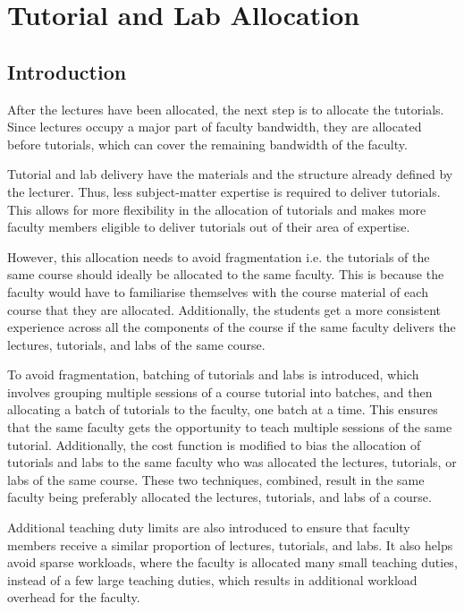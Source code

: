 \chapter{Tutorial and Lab Allocation}

\section{Introduction}

After the lectures have been allocated, the next step is to allocate the tutorials. Since lectures occupy a major part of faculty bandwidth, they are allocated before tutorials, which can cover the remaining bandwidth of the faculty.

Tutorial and lab delivery have the materials and the structure already defined by the lecturer. Thus, less subject-matter expertise is required to deliver tutorials. This allows for more flexibility in the allocation of tutorials and makes more faculty members eligible to deliver tutorials out of their area of expertise.

However, this allocation needs to avoid fragmentation i.e. the tutorials of the same course should ideally be allocated to the same faculty. This is because the faculty would have to familiarise themselves with the course material of each course that they are allocated. Additionally, the students get a more consistent experience across all the components of the course if the same faculty delivers the lectures, tutorials, and labs of the same course.

To avoid fragmentation, batching of tutorials and labs is introduced, which involves grouping multiple sessions of a course tutorial into batches, and then allocating a batch of tutorials to the faculty, one batch at a time. This ensures that the same faculty gets the opportunity to teach multiple sessions of the same tutorial.  Additionally, the cost function is modified to bias the allocation of tutorials and labs to the same faculty who was allocated the lectures, tutorials, or labs of the same course. These two techniques, combined, result in the same faculty being preferably allocated the lectures, tutorials, and labs of a course.

Additional teaching duty limits are also introduced to ensure that faculty members receive a similar proportion of lectures, tutorials, and labs. It also helps avoid sparse workloads, where the faculty is allocated many small teaching duties, instead of a few large teaching duties, which results in additional workload overhead for the faculty.

